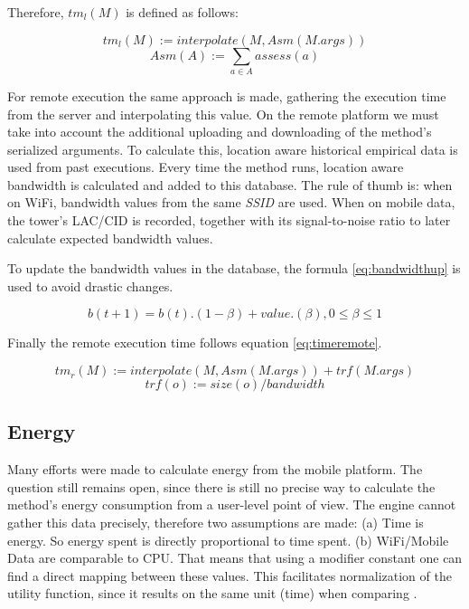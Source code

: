\documentclass[10pt, conference, letterpaper]{IEEEtran}
\begin{document}
  Therefore, $tm_{l}(M)$ is defined as follows:

  \begin{equation} \label{eq:timelocal}
    tm_{l}(M) := interpolate(M, Asm(M.args))
  \end{equation}
  \begin{equation}
    Asm(A) := \sum_{a \in A} assess(a)
  \end{equation}

  For remote execution the same approach is made, gathering the execution time from the server and interpolating this value. On the remote platform we must take into account the additional uploading and downloading of the method's serialized arguments. To calculate this, location aware historical empirical data is used from past executions. Every time the method runs, location aware bandwidth is calculated and added to this database. The rule of thumb is: when on WiFi, bandwidth values from the same \textit{SSID} are used. When on mobile data, the tower's LAC/CID is recorded, together with its signal-to-noise ratio to later calculate expected bandwidth values.

  To update the bandwidth values in the database, the formula \ref{eq:bandwidthup} is used to avoid drastic changes.

  \begin{equation} \label{eq:bandwidthup}
    b(t+1) = b(t) . (1-\beta) + value . (\beta), 0 \leq \beta \leq 1
  \end{equation}

  Finally the remote execution time follows equation \ref{eq:timeremote}.

  \begin{equation} \label{eq:timeremote}
    tm_{r}(M) := interpolate(M, Asm(M.args)) + trf(M.args)
  \end{equation}
  \begin{equation}
    trf(o) := size(o) / bandwidth
  \end{equation}

  \subsection{Energy} \label{sec:energy}

  Many efforts were made to calculate energy from the mobile platform. The question still remains open, since there is still no precise way to calculate the method's energy consumption from a user-level point of view. The engine cannot gather this data precisely, therefore two assumptions are made: (a) Time is energy. So energy spent is directly proportional to time spent. (b) WiFi/Mobile Data are comparable to CPU. That means that using a modifier constant one can find a direct mapping between these values. This facilitates normalization of the utility function, since it results on the same unit (time) when comparing \cite{6606420}.
\end{document}
